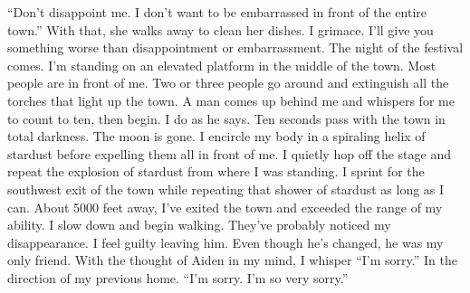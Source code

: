 \documentclass[openany, 12pt]{book}
\newcommand\tab[1][1cm]{\hspace*{#1}}
\begin{document}
\newline
\tab
``Don’t disappoint me. I don’t want to be embarrassed in front of the entire town.'' With that, she walks away to clean her dishes. I grimace. I’ll give you something worse than disappointment or embarrassment.
\newline
\newline
\tab
The night of the festival comes. I’m standing on an elevated platform in the middle of the town. Most people are in front of me. Two or three people go around and extinguish all the torches that light up the town. A man comes up behind me and whispers for me to count to ten, then begin. I do as he says. Ten seconds pass with the town in total darkness. The moon is gone. I encircle my body in a spiraling helix of stardust before expelling them all in front of me. I quietly hop off the stage and repeat the explosion of stardust from where I was standing. I sprint for the southwest exit of the town while repeating that shower of stardust as long as I can. About 5000 feet away, I’ve exited the town and exceeded the range of my ability.
\newline
\tab
I slow down and begin walking. They’ve probably noticed my disappearance. I feel guilty leaving him. Even though he's changed, he was my only friend. With the thought of Aiden in my mind, I whisper ``I’m sorry.'' In the direction of my previous home.
\newline
\tab
``I’m sorry. I’m so very sorry.''
\end{document}
